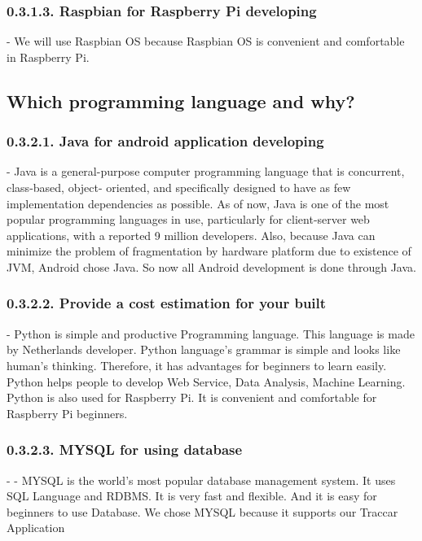 \documentclass[10pt,a4paper,twocolumn]{report}
\begin{document}
		\subsubsection{0.3.1.3. Raspbian for Raspberry Pi developing}
		- We will use Raspbian OS because Raspbian OS is convenient and comfortable in Raspberry Pi. \\
		
	\subsection{Which programming language and why?}	
		\subsubsection{0.3.2.1. Java for android application developing}
		- Java is a general-purpose computer programming language that is concurrent, class-based, object- oriented, and specifically designed to have as few implementation dependencies as possible. As of now, Java is one of the most popular programming languages in use, particularly for client-server web applications, with a reported 9 million developers. Also, because Java can minimize the problem of fragmentation by hardware platform due to existence of JVM, Android chose Java. So now all Android development is done through Java.\\
		
		\subsubsection{0.3.2.2. Provide a cost estimation for your built}	
		- Python is simple and productive Programming language. This language is made by Netherlands developer. Python language’s grammar is simple and looks like human’s thinking. Therefore, it has advantages for beginners to learn easily. Python helps people to develop Web Service, Data Analysis, Machine Learning. Python is also used for Raspberry Pi. It is convenient and comfortable for Raspberry Pi beginners. \\
	
		\subsubsection{0.3.2.3. MYSQL for using database}
		- - MYSQL is the world’s most popular database management system. It uses SQL Language and RDBMS. It is very fast and flexible. And it is easy for beginners to use Database. We chose MYSQL because it supports our Traccar Application\\
		
\end{document}
